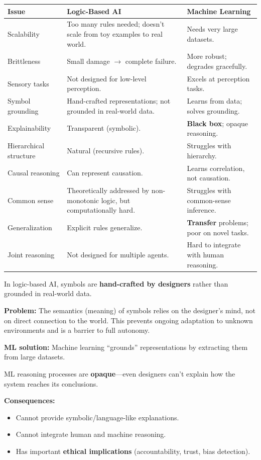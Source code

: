 \begin{center}
\renewcommand{\arraystretch}{1.3}
\begin{tabular}{@{} p{3.5cm} p{5cm} p{5cm} @{}}
\toprule
\textbf{Issue} & \textbf{Logic-Based AI} & \textbf{Machine Learning} \\
\midrule
Scalability & Too many rules needed; doesn't scale from toy examples to real world. & Needs very large datasets. \\
Brittleness & Small damage $\to$ complete failure. & More robust; degrades gracefully. \\
Sensory tasks & Not designed for low-level perception. & Excels at perception tasks. \\
Symbol grounding & Hand-crafted representations; not grounded in real-world data. & Learns from data; solves grounding. \\
Explainability & Transparent (symbolic). & \textbf{Black box}; opaque reasoning. \\
Hierarchical structure & Natural (recursive rules). & Struggles with hierarchy. \\
Causal reasoning & Can represent causation. & Learns correlation, not causation. \\
Common sense & Theoretically addressed by non-monotonic logic, but computationally hard. & Struggles with common-sense inference. \\
Generalization & Explicit rules generalize. & \textbf{Transfer} problems; poor on novel tasks. \\
Joint reasoning & Not designed for multiple agents. & Hard to integrate with human reasoning. \\
\bottomrule
\end{tabular}
\end{center}

\begin{defbox}
In logic-based AI, symbols are \textbf{hand-crafted by designers} rather than grounded in real-world data.

\textbf{Problem:} The semantics (meaning) of symbols relies on the designer's mind, not on direct connection to the world. This prevents ongoing adaptation to unknown environments and is a barrier to full autonomy.

\textbf{ML solution:} Machine learning ``grounds'' representations by extracting them from large datasets.
\end{defbox}

\begin{defbox}
ML reasoning processes are \textbf{opaque}---even designers can't explain how the system reaches its conclusions.

\textbf{Consequences:}
\begin{itemize}
  \item Cannot provide symbolic/language-like explanations.
  \item Cannot integrate human and machine reasoning.
  \item Has important \textbf{ethical implications} (accountability, trust, bias detection).
\end{itemize}
\end{defbox}

